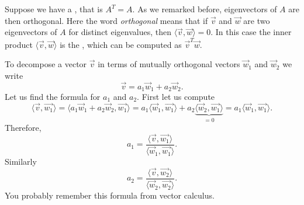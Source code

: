Suppose we have a \emph{},
that is $A^T = A$.  As we remarked before, 
eigenvectors of $A$ are then orthogonal.  Here the word
\emph{orthogonal} means
that if $\vec{v}$ and $\vec{w}$ are two 
eigenvectors of $A$ for distinct eigenvalues,
then $\langle \vec{v} , \vec{w} \rangle = 0$.
In this case the inner product $\langle \vec{v} , \vec{w} \rangle$
is the \emph{},
which can be computed as $\vec{v}^T\vec{w}$.

To decompose a vector $\vec{v}$ in terms of mutually orthogonal
vectors $\vec{w}_1$ and $\vec{w}_2$ we write
\begin{equation*}
\vec{v} = a_1 \vec{w}_1  + a_2 \vec{w}_2 .
\end{equation*}
Let us find the formula for $a_1$ and $a_2$.  First let us compute
\begin{equation*}
\langle \vec{v} , \vec{w_1} \rangle
=
\langle a_1 \vec{w}_1  + a_2 \vec{w}_2 , \vec{w_1} \rangle
=
a_1 \langle \vec{w}_1 , \vec{w_1} \rangle
+
a_2 \underbrace{\langle \vec{w}_2 , \vec{w_1} \rangle}_{=0}
=
a_1 \langle \vec{w}_1 , \vec{w_1} \rangle .
\end{equation*}
Therefore,
\begin{equation*}
a_1 = 
\frac{\langle \vec{v} , \vec{w_1} \rangle}{
\langle \vec{w}_1 , \vec{w_1} \rangle} .
\end{equation*}
Similarly
\begin{equation*}
a_2 = 
\frac{\langle \vec{v} , \vec{w_2} \rangle}{
\langle \vec{w}_2 , \vec{w_2} \rangle} .
\end{equation*}
You probably remember this formula from vector calculus.

